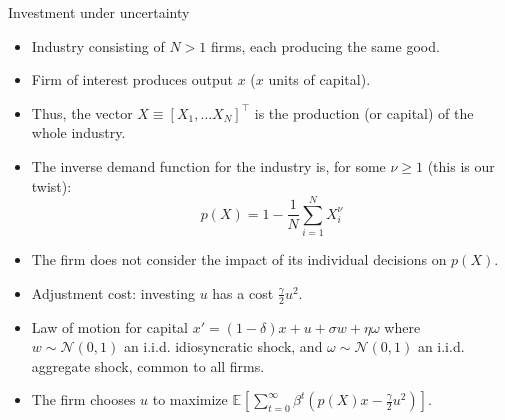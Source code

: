 \documentclass[aspectratio=169,10pt]{beamer}
\newcommand{\expec}[2][]{\ensuremath{\mathbb{E}_{{#1}}\left[ {#2} \right]}}
\begin{document}
\begin{frame}{Investment under uncertainty}
		
		\begin{itemize}
			
			\item Industry consisting of $N > 1$ firms, each producing the same good.\vspace{0.1in}
			
			\item Firm of interest  produces output $x$ ($x$ units of capital).\vspace{0.1in}
			
			\item Thus, the vector $X \equiv [X_1, \ldots X_N]^\top$ is the production (or capital) of the whole industry.\vspace{0.1in}
			
			\item The inverse demand function for the industry is, for some $\nu \geq 1$ (this is our twist):
			\begin{equation*}
				p(X) = 1 - \frac{1}{N}\sum_{i=1}^N X_i^{\nu}
			\end{equation*}
			
			\item The firm does not consider the impact of its individual decisions on $p(X)$. \vspace{0.1in}
			
			\item Adjustment cost: investing $u$ has a cost $\frac{\gamma}{2}u^2$.\vspace{0.1in}
			
			\item Law of motion for capital $x' = (1-\delta)x + u + \sigma w + \eta \omega$ where $w \sim \mathcal{N}(0,1)$ an i.i.d. idiosyncratic shock,  and $\omega \sim \mathcal{N}(0,1)$ an i.i.d. aggregate shock, common to all firms.\vspace{0.1in}
			
			\item The firm chooses $u$ to maximize $\expec{\sum_{t=0}^{\infty} \beta^t \left(p(X)x-\frac{\gamma}{2}u^2\right)}$.\vspace{0.1in}
			
		\end{itemize}
		
\end{frame}
\end{document}
